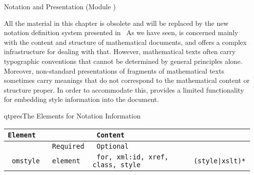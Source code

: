 
\begin{omgroup}[creators=miko,short={Notation and Presentation},id=pres]
                          {Notation and Presentation (Module {})}

\begin{module}[id=presintro]
\begin{oldpart}{All the material in this chapter is obsolete and will be replaced by the
    new notation definition system presented in~\cite{KMR:NoLMD08}}
  As we have seen, \omdoc is concerned mainly with the content and structure of
  mathematical documents, and offers a complex infrastructure for dealing with that.
  However, mathematical texts often carry typographic conventions that cannot be
  determined by general principles alone. Moreover, non-standard presentations of
  fragments of mathematical texts sometimes carry meanings that do not correspond to the
  mathematical content or structure proper. In order to accommodate this, \omdoc
  provides a limited functionality for embedding style information into the document.

\begin{presonly}
\begin{myfig}{qtpres}{The \omdoc Elements for Notation Information}
\begin{scriptsize}
\begin{tabular}{|>{\tt}l|>{\tt}l|>{\tt}p{}|>{\tt}p{}|}\hline
{\rm Element}& \multicolumn{2}{l|}{Attributes\hspace*{2.25cm}} & Content  \\\hline
             & {\rm Required}  & {\rm Optional}     &           \\\hline\hline
 omstyle    & element & for, xml:id, xref, class, style & (style|xslt)* \\\hline
\end{tabular}
\end{scriptsize}
\end{myfig}
\end{presonly}


\end{oldpart}
\end{module}
\end{omgroup}
